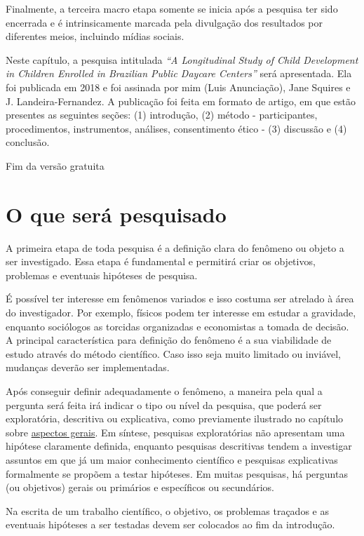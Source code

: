\documentclass[
]{book}
\begin{document}
Finalmente, a terceira macro etapa somente se inicia após a pesquisa ter sido encerrada e é intrinsicamente marcada pela divulgação dos resultados por diferentes meios, incluindo mídias sociais.

Neste capítulo, a pesquisa intitulada \emph{``A Longitudinal Study of Child Development in Children Enrolled in Brazilian Public Daycare Centers''} será apresentada. Ela foi publicada em 2018 e foi assinada por mim (Luis Anunciação), Jane Squires e J. Landeira-Fernandez. A publicação foi feita em formato de artigo, em que estão presentes as seguintes seções: (1) introdução, (2) método - participantes, procedimentos, instrumentos, análises, consentimento ético - (3) discussão e (4) conclusão.

Fim da versão gratuita

\hypertarget{o-que-seruxe1-pesquisado}{%
\section{O que será pesquisado}\label{o-que-seruxe1-pesquisado}}

A primeira etapa de toda pesquisa é a definição clara do fenômeno ou objeto a ser investigado. Essa etapa é fundamental e permitirá criar os objetivos, problemas e eventuais hipóteses de pesquisa.

É possível ter interesse em fenômenos variados e isso costuma ser atrelado à área do investigador. Por exemplo, físicos podem ter interesse em estudar a gravidade, enquanto sociólogos as torcidas organizadas e economistas a tomada de decisão. A principal característica para definição do fenômeno é a sua viabilidade de estudo através do método científico. Caso isso seja muito limitado ou inviável, mudanças deverão ser implementadas.

Após conseguir definir adequadamente o fenômeno, a maneira pela qual a pergunta será feita irá indicar o tipo ou nível da pesquisa, que poderá ser exploratória, descritiva ou explicativa, como previamente ilustrado no capítulo sobre \href{https://anovabr.github.io/mqt/aspectos-gerais.html\#os-objetivos-de-uma-pesquisa}{aspectos gerais}. Em síntese, pesquisas exploratórias não apresentam uma hipótese claramente definida, enquanto pesquisas descritivas tendem a investigar assuntos em que já um maior conhecimento científico e pesquisas explicativas formalmente se propõem a testar hipóteses. Em muitas pesquisas, há perguntas (ou objetivos) gerais ou primários e específicos ou secundários.

Na escrita de um trabalho científico, o objetivo, os problemas traçados e as eventuais hipóteses a ser testadas devem ser colocados ao fim da introdução.
\end{document}
